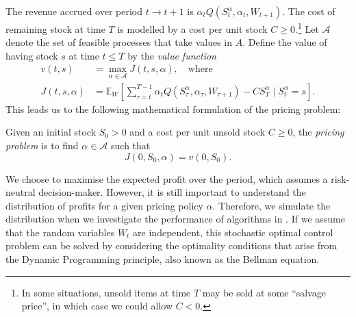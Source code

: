 \documentclass[main.tex]{subfiles}
\begin{document}
The revenue accrued over period $t\to t+1$ is $\alpha_tQ(S_t^\alpha,\alpha_t,W_{t+1})$.
The cost of remaining stock at time $T$ is modelled by a cost per unit
stock $C\geq 0$.\footnote{In some situations, unsold items at time $T$
  may be sold at some ``salvage price'', in which case we could allow
  $C<0$.}
Let $\mathcal A$ denote the set of feasible processes that take values
in $A$.
Define the value of having stock $s$ at time $t\leq T$
by the \emph{value function}
\begin{align}\label{eq:value_function_def}
  v(t,s)&=\max_{\alpha\in\mathcal A} J(t,s,\alpha),\quad\text{where}\\
  J(t,s,\alpha)&=
                 \mathbb E_{W}\left[ \sum_{\tau=t}^{T-1}
                 \alpha_tQ(S_\tau^\alpha,\alpha_\tau,W_{\tau+1})
                 - CS_T^\alpha \mid S_t^\alpha = s
                 \right].
                 \label{eq:value_function_def2}
\end{align}
This leads us to the following mathematical formulation of the pricing
problem:
\begin{mydef}
  Given an initial stock $S_0>0$ and a cost per unit unsold stock $C\geq
  0$, the \emph{pricing problem} is to find $\alpha\in\mathcal A$ such that
  \begin{equation}
    J(0,S_0,\alpha) = v(0,S_0).
  \end{equation}
\end{mydef}
We choose to maximise the expected profit over the period, which
assumes a risk-neutral decision-maker. However, it is still important
to understand the distribution of profits for a given pricing policy
$\alpha$. Therefore, we simulate the distribution when
we investigate the performance of algorithms in
.
If we assume that the random variables $W_t$ are independent, this
stochastic optimal control problem can be solved by
considering the optimality conditions that arise from the Dynamic
Programming principle, also known as the Bellman equation.
\end{document}
